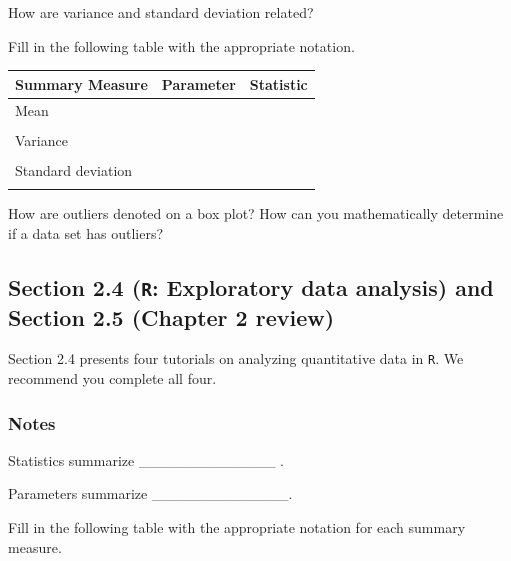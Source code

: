\documentclass[
]{report}
\newcommand{\rgs}{\vspace{12pt}} %
\begin{document}
How are variance and standard deviation related?
\rgs

Fill in the following table with the appropriate notation.

\begin{center}
\begin{tabular}{|l|p{2in}|p{2in}|} \hline
Summary Measure & Parameter & Statistic \\ \hline
Mean & & \\ 
& & \\ \hline
Variance & & \\ 
& & \\ \hline
Standard deviation & & \\ 
& & \\ \hline
\end{tabular}
\end{center}

How are outliers denoted on a box plot? How can you mathematically determine if a data set has outliers?
\rgs

\hypertarget{section-2.4-r-exploratory-data-analysis-and-section-2.5-chapter-2-review}{%
\subsection*{\texorpdfstring{Section 2.4 (\texttt{R}: Exploratory data analysis) and Section 2.5 (Chapter 2 review)}{Section 2.4 (R: Exploratory data analysis) and Section 2.5 (Chapter 2 review)}}\label{section-2.4-r-exploratory-data-analysis-and-section-2.5-chapter-2-review}}

Section 2.4 presents four tutorials on analyzing quantitative data in \texttt{R}. We recommend you complete all four.

\hypertarget{notes-7}{%
\subsubsection*{Notes}\label{notes-7}}

Statistics summarize \_\_\_\_\_\_\_\_\_\_\_\_\_ .

Parameters summarize \_\_\_\_\_\_\_\_\_\_\_\_\_.

\newpage

Fill in the following table with the appropriate notation for each summary measure.
\end{document}

